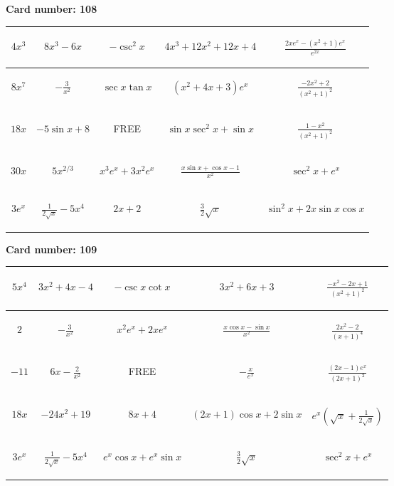 \documentclass{article}
\newcommand{\entry}[1]{\begin{minipage}[t][2.75cm][t]{4cm} \vspace{1cm} \begin{center}#1\end{center} \end{minipage}}
\newcommand{\freespace}{\entry{FREE}}
\newcommand{\cardnumber}[1]{\noindent \textbf{Card number: #1} \bigskip}
\begin{document}
\pagebreak

\cardnumber{108}
\begin{center}
\begin{tabular}{|*{5}{c|}}
    \hline
    \entry{$4x^3$} & \entry{$8x^3 - 6x$} & \entry{$-\csc^2 x$} & \entry{$4x^3 + 12x^2 + 12x + 4$} & \entry{$\frac{2x e^x - (x^2 + 1) e^x}{e^{2x}}$} \\ \hline
    \entry{$8x^7$} & \entry{$-\frac{3}{x^2}$} & \entry{$\sec x \tan x$} & \entry{$(x^2 + 4x + 3) e^x$} & \entry{$\frac{-2x^2 + 2}{(x^2 + 1)^2}$} \\ \hline
    \entry{$18x$} & \entry{$-5 \sin x + 8$} & \freespace & \entry{$\sin x \sec^2 x + \sin x$} & \entry{$\frac{1 - x^2}{(x^2 + 1)^2}$} \\ \hline
    \entry{$30x$} & \entry{$5x^{2/3}$} & \entry{$x^3 e^x + 3x^2 e^x$} & \entry{$\frac{x \sin x + \cos x - 1}{x^2}$} & \entry{$\sec^2 x + e^x$} \\ \hline
    \entry{$3e^x$} & \entry{$\frac{1}{2\sqrt{x}} - 5x^4$} & \entry{$2x + 2$} & \entry{$\frac{3}{2} \sqrt{x}$} & \entry{$\sin^2 x + 2x \sin x \cos x$} \\ \hline
\end{tabular}
\end{center}

\pagebreak

\cardnumber{109}
\begin{center}
\begin{tabular}{|*{5}{c|}}
    \hline
    \entry{$5x^4$} & \entry{$3x^2 + 4x - 4$} & \entry{$-\csc x \cot x$} & \entry{$3x^2 + 6x + 3$} & \entry{$\frac{-x^2 - 2x + 1}{(x^2 + 1)^2}$} \\ \hline
    \entry{$2$} & \entry{$-\frac{3}{x^2}$} & \entry{$x^2 e^x + 2x e^x$} & \entry{$\frac{x \cos x - \sin x}{x^2}$} & \entry{$\frac{2x^2 - 2}{(x + 1)^4}$} \\ \hline
    \entry{$-11$} & \entry{$6x - \frac{2}{x^2}$} & \freespace & \entry{$-\frac{x}{e^x}$} & \entry{$\frac{(2x - 1) e^x}{(2x + 1)^2}$} \\ \hline
    \entry{$18x$} & \entry{$-24x^2 + 19$} & \entry{$8x + 4$} & \entry{$(2x + 1) \cos x + 2 \sin x$} & \entry{$e^x \left(\sqrt{x} + \frac{1}{2\sqrt{x}}\right)$} \\ \hline
    \entry{$3e^x$} & \entry{$\frac{1}{2\sqrt{x}} - 5x^4$} & \entry{$e^x \cos x + e^x \sin x$} & \entry{$\frac{3}{2} \sqrt{x}$} & \entry{$\sec^2 x + e^x$} \\ \hline
\end{tabular}
\end{center}
\end{document}
